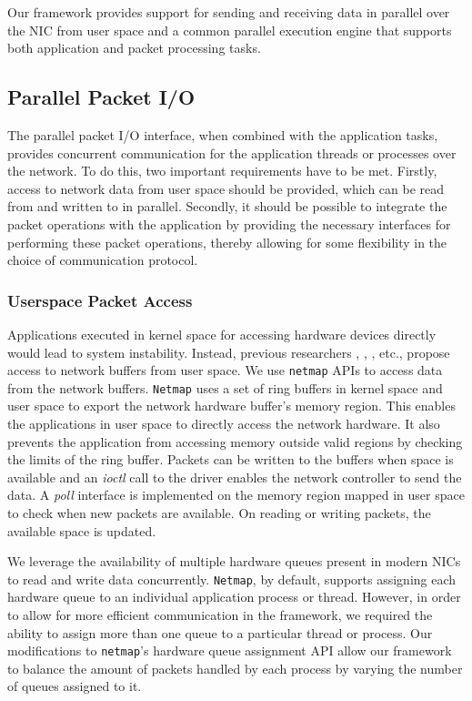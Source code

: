 \documentclass[10pt, conference, compsocconf, reqno]{IEEEtran}
\begin{document}
Our framework provides support for sending and receiving data in parallel over the NIC from user space and a common parallel execution engine that supports both application and packet processing tasks.

\subsection{Parallel Packet I/O}
\label{ppio}
The parallel packet I/O interface, when combined with the application tasks, provides concurrent communication for the application threads or processes over the network. To do this, two important requirements have to be met. Firstly, access to network data from user space should be provided, which can be read from and written to in parallel. Secondly, it should be possible to integrate the packet operations with the application by providing the necessary interfaces for performing these packet operations, thereby allowing for some flexibility in the choice of communication protocol.

\subsubsection{Userspace Packet Access}
Applications executed in kernel space for accessing hardware devices directly would lead to system instability. Instead, previous researchers \cite{Rizzo:2012:RNI:2090147.2103536}, \cite{1564468}, \cite{Krasnyansky}, etc., propose access to network buffers from user space. We use \texttt{netmap} APIs \cite{Rizzo:2012:RNI:2090147.2103536} to access data from the network buffers. \texttt{Netmap} uses a set of ring buffers in kernel space and user space to export the network hardware buffer's memory region. This enables the applications in user space to directly access the network hardware. It also prevents the application from accessing memory outside valid regions by checking the limits of the ring buffer. Packets can be written to the buffers when space is available and an \textit{ioctl} call to the driver enables the network controller to send the data. A \textit{poll} interface is implemented on the memory region mapped in user space to check when new packets are available. On reading or writing packets, the available space is updated.

We leverage the availability of multiple hardware queues present in modern NICs to read and write data concurrently. \texttt{Netmap}, by default, supports assigning each hardware queue to an individual application process or thread. However, in order to allow for more efficient communication in the framework, we required the ability to assign more than one queue to a particular thread or process. Our modifications to \texttt{netmap}'s hardware queue assignment API allow our framework to balance the amount of packets handled by each process by varying the number of queues assigned to it.
\end{document}
